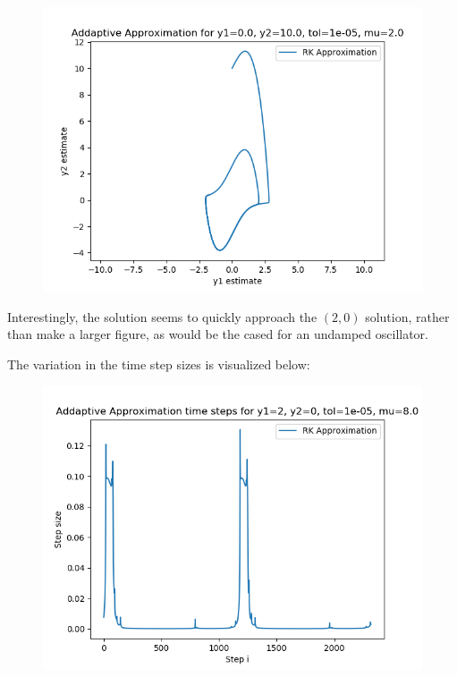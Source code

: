 \documentclass{article}
\begin{document}
\begin{itemize}
\begin{figure}[H]
		\end{figure}
		\begin{figure}[H]
			\includegraphics[scale=0.6]{start_2_0_10}
		\end{figure}
		Interestingly, the solution seems to quickly approach the $(2,
		0)$ solution, rather than make a larger figure, as would be the
		cased for an undamped oscillator.

		The variation in the time step sizes is visualized below:
		\begin{figure}[H]
			\includegraphics[scale=0.6]{adapt_times}
		\end{figure}


\end{itemize}
\end{document}
